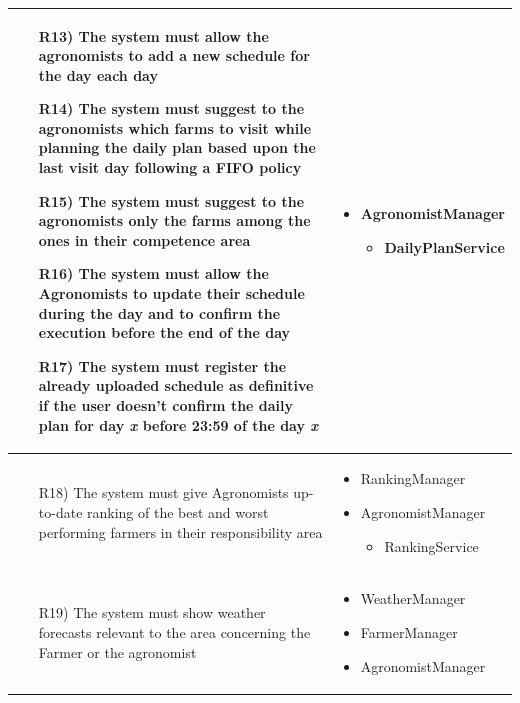 \documentclass[table, 12pt]{article}
\begin{document}
\begin{longtable}{|p{}|p{}|}
    \begin{itemize}
        \item[R13)] The system must allow the agronomists to add a new schedule for the day each day
        \item[R14)] The system must suggest to the agronomists which farms to visit while planning the daily plan based upon the last visit day following a FIFO policy
        \item[R15)] The system must suggest to the agronomists only the farms among the ones in their competence area  
        \item[R16)] The system must allow the Agronomists to update their schedule during the day and to confirm the execution before the end of the day
        \item[R17)] The system must register the already uploaded schedule as definitive if the user doesn't confirm the daily plan for day \textit{x} before 23:59 of the day \textit{x}  
    \end{itemize}

    &
    \begin{itemize}
        \item AgronomistManager \begin{itemize}
            \item DailyPlanService
        \end{itemize}
    \end{itemize}
    \\\hline

    \begin{itemize}
        \item[R18)] The system must give Agronomists up-to-date ranking of the best and worst performing farmers in their responsibility area 
    \end{itemize}
    &
    \begin{itemize}
        \item RankingManager 
        \item AgronomistManager
        \begin{itemize}
            \item RankingService
        \end{itemize}
    \end{itemize}
    \\\hline

    \begin{itemize}
        \item[R19)] The system must show weather forecasts relevant to the area concerning the Farmer or the agronomist
    \end{itemize}
    &
    \begin{itemize}
        \item WeatherManager
        \item FarmerManager
        \item AgronomistManager
    \end{itemize}
    \\\hline


\end{longtable}
\end{document}
